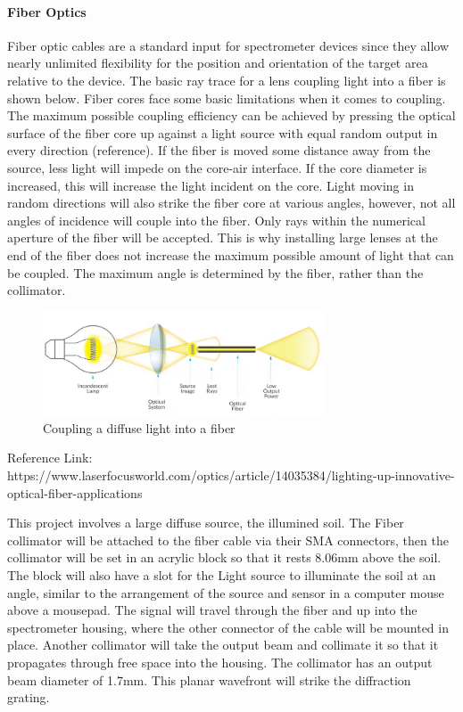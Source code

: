 \paragraph{Fiber Optics} Fiber optic cables are a standard input for spectrometer devices since they allow nearly unlimited flexibility for the position and orientation of the target area relative to the device. The basic ray trace for a lens coupling light into a fiber is shown below. Fiber cores face some basic limitations when it comes to coupling. The maximum possible coupling efficiency can be achieved by pressing the optical surface of the fiber core up against a light source with equal random output in every direction (reference). If the fiber is moved some distance away from the source, less light will impede on the core-air interface. If the core diameter is increased, this will increase the light incident on the core. Light moving in random directions will also strike the fiber core at various angles, however, not all angles of incidence will couple into the fiber. Only rays within the numerical aperture of the fiber will be accepted. This is why installing large lenses at the end of the fiber does not increase the maximum possible amount of light that can be coupled. The maximum angle is determined by the fiber, rather than the collimator.

\begin{figure}[H]
    \caption{Coupling a diffuse light into a fiber}
    \centering
    \includegraphics[width=0.75\textwidth]{images/CouplingDiffuseLighttoFiber.png}
\end{figure}
Reference Link: https://www.laserfocusworld.com/optics/article/14035384/lighting-up-innovative-optical-fiber-applications

This project involves a large diffuse source, the illumined soil. The Fiber collimator will be attached to the fiber cable via their SMA connectors, then the collimator will be set in an acrylic block so that it rests 8.06mm above the soil. The block will also have a slot for the Light source to illuminate the soil at an angle, similar to the arrangement of the source and sensor in a computer mouse above a mousepad.
The signal will travel through the fiber and up into the spectrometer housing, where the other connector of the cable will be mounted in place. Another collimator will take the output beam and collimate it so that it propagates through free space into the housing. The collimator has an output beam diameter of 1.7mm. This planar wavefront will strike the diffraction grating.


